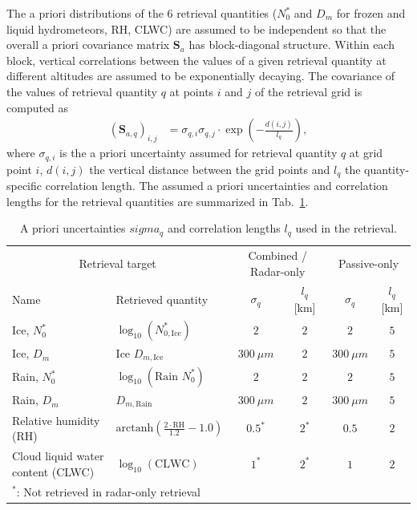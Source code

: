 \documentclass[journal abbreviation, manuscript]{copernicus}
\begin{document}
The a priori distributions of the 6 retrieval quantities ($N_0^*$ and $D_m$ for
frozen and liquid hydrometeors, RH, CLWC) are assumed to be independent so that
the overall a priori covariance matrix $\mathbf{S}_a$ has block-diagonal
structure. Within each block, vertical correlations between the values of a
given retrieval quantity at different altitudes are assumed to be exponentially
decaying. The covariance of the values of retrieval quantity $q$ at
points $i$ and $j$ of the retrieval grid is computed as
%
\begin{align}
\left ( \mathbf{S}_{a,q} \right )_{i, j} &= \sigma_{q,i} \sigma_{q,j}
 \cdot \exp  \left ( -\frac{d(i, j)}{l_q} \right ),
\end{align}
%
where $\sigma_{q, i}$ is the a priori uncertainty assumed for retrieval quantity
$q$ at grid point $i$, $d(i, j)$ the vertical distance between the grid points
and $l_q$ the quantity-specific correlation length. The assumed a priori
uncertainties and correlation lengths for the retrieval quantities are
summarized in Tab.~\ref{tab:a_priori}.

\begin{table}[h!]
\caption{A priori uncertainties $sigma_q$ and correlation lengths $l_q$ used in the retrieval.}
 \centering
\label{tab:a_priori}
    \begin{tabular}{ll|cc|cc|}
      \multicolumn{2}{c|}{Retrieval target}  & \multicolumn{2}{c|}{Combined / Radar-only} & \multicolumn{2}{c}{Passive-only}\\
      Name & Retrieved quantity &  $\sigma_q$ & $l_q$ [km] & $\sigma_q$ & $l_q$ [km]\\
    \hline
Ice, $N_0^*$ & $\log_{10}(N_{0, \text{Ice}}^*)$ & $2$ & $2$ & $2$ &$5$ \\
Ice, $D_m$ &   $\text{Ice }D_{m, \text{Ice}}$   & $300\ \unit{\mu m}$  & $2$ & $300\ \unit{\mu m}$          & $5$ \\
Rain, $N_0^*$ &    $\log_{10}(\text{Rain } N_{0}^*)$ & $2$ & $2$ & $2$ &$5$ \\
Rain, $D_m$ &  $D_{m, \text{Rain}}$   & $300\ \unit{\mu m}$  & $2$ & $300\ \unit{\mu m}$          & $5$ \\
Relative humidity (RH) & $\text{arctanh}(\frac{2 \cdot \text{RH}}{1.2} - 1.0)$ & $0.5^{*}$ & $2^{*}$ & $0.5$ & $2$ \\
Cloud liquid water content (CLWC) & $\log_{10}(\text{CLWC}) $ & $1^{*}$ & $2^{*}$  & $1$ & $2$ \\
\multicolumn{6}{l}{$^*$: Not retrieved in radar-only retrieval}
    \end{tabular}
\end{table}
\end{document}
